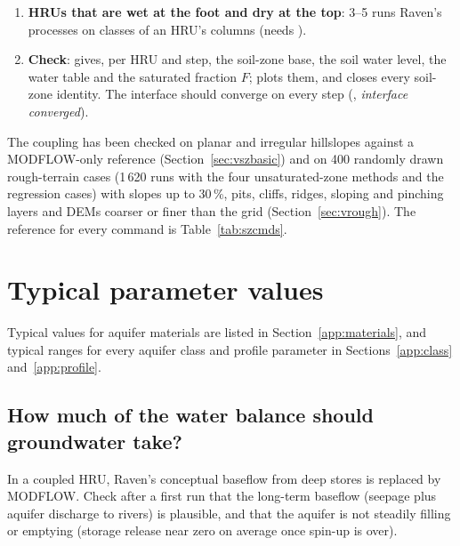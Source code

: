 \begin{enumerate}
recharge through the unsaturated zone between the soil and the water table, with its delay; on hummocky ground
 3 gives the hollows and the hummocks their own columns (Section~\ref{sec:vzclasses}). Capillary
rise from a shallow water table is then on by default. Figure~\ref{fig:szregimes} shows every position of the water
table and what carries the water in each; the coupling moves between them without any setting.
\item \textbf{HRUs that are wet at the foot and dry at the top}:  3--5 runs Raven's processes on
classes of an HRU's columns (needs ).
\item \textbf{Check}:  gives, per HRU and step, the soil-zone base, the soil water level, the water
table and the saturated fraction $F$;  plots them, and  closes every
soil-zone identity. The interface should converge on every step (, \emph{interface converged}).
\end{enumerate}
The coupling has been checked on planar and irregular hillslopes against a MODFLOW-only reference
(Section~\ref{sec:vszbasic}) and on 400 randomly drawn rough-terrain cases (1\,620 runs with the four unsaturated-zone methods and the
regression cases) with slopes up to 30\,\%, pits, cliffs,
ridges, sloping and pinching layers and DEMs coarser or finer than the grid (Section~\ref{sec:vrough}). The reference
for every command is Table~\ref{tab:szcmds}.

\section{Typical parameter values}
Typical values for aquifer materials are listed in Section~\ref{app:materials}, and typical ranges for every aquifer class
and profile parameter in Sections~\ref{app:class} and~\ref{app:profile}.

\subsection{How much of the water balance should groundwater take?}
In a coupled HRU, Raven's conceptual baseflow from deep stores is replaced by MODFLOW. Check after a first run that the
long-term baseflow (seepage plus aquifer discharge to rivers) is plausible, and that the aquifer is not steadily filling or
emptying (storage release near zero on average once spin-up is over).


